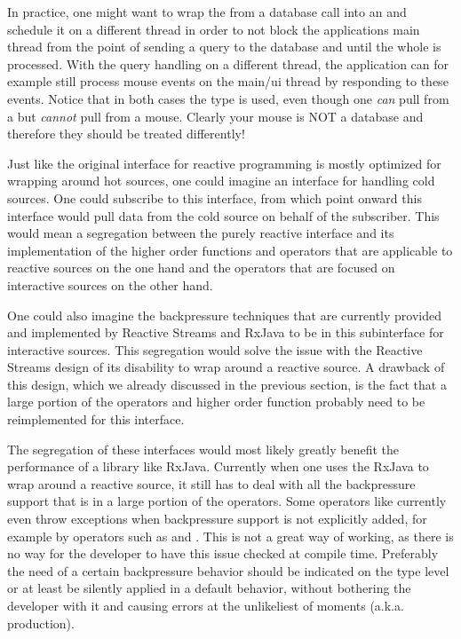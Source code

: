 In practice, one might want to wrap the  from a database call into an \obs and schedule it on a different thread in order to not block the applications main thread from the point of sending a query to the database and until the whole  is processed. With the query handling on a different thread, the application can for example still process mouse events on the main/ui thread by responding to these events. Notice that in both cases the \obs type is used, even though one \emph{can} pull from a  but \emph{cannot} pull from a mouse. Clearly your mouse is NOT a database and therefore they should be treated differently!

Just like the original interface for reactive programming is mostly optimized for wrapping around hot sources, one could imagine an interface for handling cold sources. One could subscribe to this interface, from which point onward this interface would pull data from the cold source on behalf of the subscriber. This would mean a segregation between the purely reactive interface and its implementation of the higher order functions and operators that are applicable to reactive sources on the one hand and the operators that are focused on interactive sources on the other hand.

One could also imagine the backpressure techniques that are currently provided and implemented by Reactive Streams and RxJava to be in this subinterface for interactive sources. This segregation would solve the issue with the Reactive Streams design of its disability to wrap around a reactive source. A drawback of this design, which we already discussed in the previous section, is the fact that a large portion of the operators and higher order function probably need to be reimplemented for this interface.

The segregation of these interfaces would most likely greatly benefit the performance of a library like RxJava. Currently when one uses the RxJava \obs to wrap around a reactive source, it still has to deal with all the backpressure support that is in a large portion of the operators. Some operators like  currently even throw exceptions when backpressure support is not explicitly added, for example by operators such as  and . This is not a great way of working, as there is no way for the developer to have this issue checked at compile time. Preferably the need of a certain backpressure behavior should be indicated on the type level or at least be silently applied in a default behavior, without bothering the developer with it and causing errors at the unlikeliest of moments (a.k.a. production).

